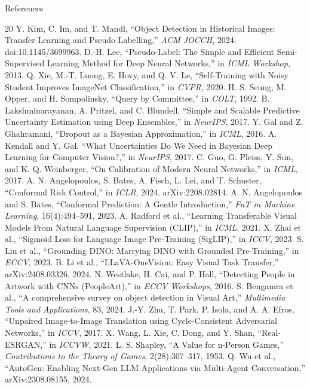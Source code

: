 \documentclass[aspectratio=169,11pt]{beamer}
\begin{document}
\begin{frame}[allowframebreaks]{References}
\tiny
\begin{thebibliography}{20}
 Y. Kim, C. Im, and T. Mandl, ``Object Detection in Historical Images: Transfer Learning and Pseudo Labelling,'' \textit{ACM JOCCH}, 2024. doi:10.1145/3699963.
 D.-H. Lee, ``Pseudo-Label: The Simple and Efficient Semi-Supervised Learning Method for Deep Neural Networks,'' in \textit{ICML Workshop}, 2013.
 Q. Xie, M.-T. Luong, E. Hovy, and Q. V. Le, ``Self-Training with Noisy Student Improves ImageNet Classification,'' in \textit{CVPR}, 2020.
 H. S. Seung, M. Opper, and H. Sompolinsky, ``Query by Committee,'' in \textit{COLT}, 1992.
 B. Lakshminarayanan, A. Pritzel, and C. Blundell, ``Simple and Scalable Predictive Uncertainty Estimation using Deep Ensembles,'' in \textit{NeurIPS}, 2017.
 Y. Gal and Z. Ghahramani, ``Dropout as a Bayesian Approximation,'' in \textit{ICML}, 2016.
 A. Kendall and Y. Gal, ``What Uncertainties Do We Need in Bayesian Deep Learning for Computer Vision?,'' in \textit{NeurIPS}, 2017.
 C. Guo, G. Pleiss, Y. Sun, and K. Q. Weinberger, ``On Calibration of Modern Neural Networks,'' in \textit{ICML}, 2017.
 A. N. Angelopoulos, S. Bates, A. Fisch, L. Lei, and T. Schuster, ``Conformal Risk Control,'' in \textit{ICLR}, 2024. arXiv:2208.02814.
 A. N. Angelopoulos and S. Bates, ``Conformal Prediction: A Gentle Introduction,'' \textit{FnT in Machine Learning}, 16(4):494--591, 2023.
 A. Radford et al., ``Learning Transferable Visual Models From Natural Language Supervision (CLIP),'' in \textit{ICML}, 2021.
 X. Zhai et al., ``Sigmoid Loss for Language Image Pre-Training (SigLIP),'' in \textit{ICCV}, 2023.
 S. Liu et al., ``Grounding DINO: Marrying DINO with Grounded Pre-Training,'' in \textit{ECCV}, 2023.
 B. Li et al., ``LLaVA-OneVision: Easy Visual Task Transfer,'' arXiv:2408.03326, 2024.
 N. Westlake, H. Cai, and P. Hall, ``Detecting People in Artwork with CNNs (PeopleArt),'' in \textit{ECCV Workshops}, 2016.
 S. Bengamra et al., ``A comprehensive survey on object detection in Visual Art,'' \textit{Multimedia Tools and Applications}, 83, 2024.
 J.-Y. Zhu, T. Park, P. Isola, and A. A. Efros, ``Unpaired Image-to-Image Translation using Cycle-Consistent Adversarial Networks,'' in \textit{ICCV}, 2017.
 X. Wang, L. Xie, C. Dong, and Y. Shan, ``Real-ESRGAN,'' in \textit{ICCVW}, 2021.
 L. S. Shapley, ``A Value for n-Person Games,'' \textit{Contributions to the Theory of Games}, 2(28):307--317, 1953.
 Q. Wu et al., ``AutoGen: Enabling Next-Gen LLM Applications via Multi-Agent Conversation,'' arXiv:2308.08155, 2024.
\end{thebibliography}
\end{frame}
\end{document}

